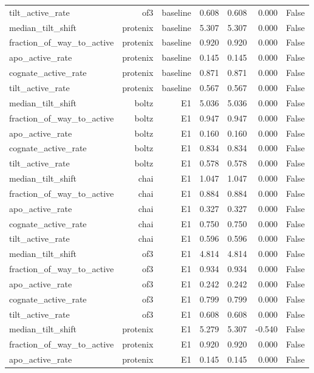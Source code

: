 \begin{longtable}{lrrrrrr}
tilt\_active\_rate & of3 & baseline & 0.608 & 0.608 & 0.000 & False \\
median\_tilt\_shift & protenix & baseline & 5.307 & 5.307 & 0.000 & False \\
fraction\_of\_way\_to\_active & protenix & baseline & 0.920 & 0.920 & 0.000 & False \\
apo\_active\_rate & protenix & baseline & 0.145 & 0.145 & 0.000 & False \\
cognate\_active\_rate & protenix & baseline & 0.871 & 0.871 & 0.000 & False \\
tilt\_active\_rate & protenix & baseline & 0.567 & 0.567 & 0.000 & False \\
median\_tilt\_shift & boltz & E1 & 5.036 & 5.036 & 0.000 & False \\
fraction\_of\_way\_to\_active & boltz & E1 & 0.947 & 0.947 & 0.000 & False \\
apo\_active\_rate & boltz & E1 & 0.160 & 0.160 & 0.000 & False \\
cognate\_active\_rate & boltz & E1 & 0.834 & 0.834 & 0.000 & False \\
tilt\_active\_rate & boltz & E1 & 0.578 & 0.578 & 0.000 & False \\
median\_tilt\_shift & chai & E1 & 1.047 & 1.047 & 0.000 & False \\
fraction\_of\_way\_to\_active & chai & E1 & 0.884 & 0.884 & 0.000 & False \\
apo\_active\_rate & chai & E1 & 0.327 & 0.327 & 0.000 & False \\
cognate\_active\_rate & chai & E1 & 0.750 & 0.750 & 0.000 & False \\
tilt\_active\_rate & chai & E1 & 0.596 & 0.596 & 0.000 & False \\
median\_tilt\_shift & of3 & E1 & 4.814 & 4.814 & 0.000 & False \\
fraction\_of\_way\_to\_active & of3 & E1 & 0.934 & 0.934 & 0.000 & False \\
apo\_active\_rate & of3 & E1 & 0.242 & 0.242 & 0.000 & False \\
cognate\_active\_rate & of3 & E1 & 0.799 & 0.799 & 0.000 & False \\
tilt\_active\_rate & of3 & E1 & 0.608 & 0.608 & 0.000 & False \\
median\_tilt\_shift & protenix & E1 & 5.279 & 5.307 & -0.540 & False \\
fraction\_of\_way\_to\_active & protenix & E1 & 0.920 & 0.920 & 0.000 & False \\
apo\_active\_rate & protenix & E1 & 0.145 & 0.145 & 0.000 & False \\

\end{longtable}
